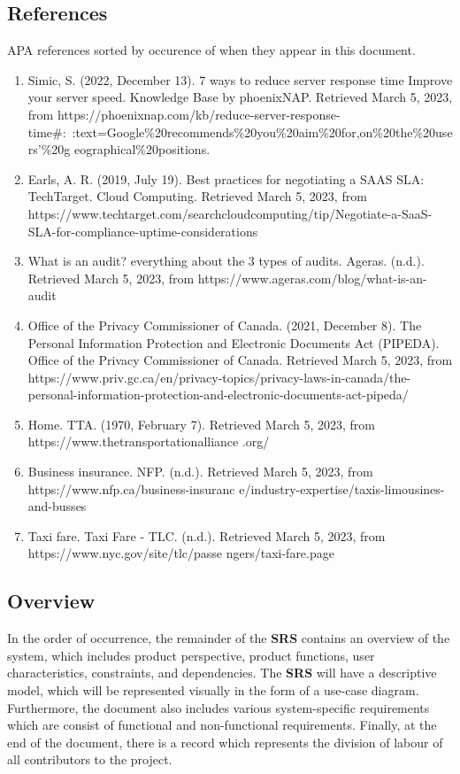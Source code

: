 \documentclass[]{article}
\begin{document}
\subsection{References}
\label{sub:references}
APA references sorted by occurence of when they appear in this document.
\begin{enumerate}
	\item Simic, S. (2022, December 13). 7 ways to reduce server response time {Improve your server speed}. Knowledge Base by phoenixNAP. Retrieved March 5, 2023, from https://phoenixnap.com/kb/reduce-server-response-time\#:~:text=Google\%20recommends\%20you\%20aim\%20for,on\%20the\%20users'\%20g eographical\%20positions.
	\item Earls, A. R. (2019, July 19). Best practices for negotiating a SAAS SLA: TechTarget. Cloud Computing. Retrieved March 5, 2023, from https://www.techtarget.com/searchcloudcomputing/tip/Negotiate-a-SaaS-SLA-for-compliance-uptime-considerations
	\item What is an audit? everything about the 3 types of audits. Ageras. (n.d.). Retrieved March 5, 2023, from https://www.ageras.com/blog/what-is-an-audit
	\item Office of the Privacy Commissioner of Canada. (2021, December 8). The Personal Information Protection and Electronic Documents Act (PIPEDA). Office of the Privacy Commissioner of Canada. Retrieved March 5, 2023, from https://www.priv.gc.ca/en/privacy-topics/privacy-laws-in-canada/the-personal-information-protection-and-electronic-documents-act-pipeda/
	\item Home. TTA. (1970, February 7). Retrieved March 5, 2023, from https://www.thetransportationalliance .org/
	\item Business insurance. NFP. (n.d.). Retrieved March 5, 2023, from https://www.nfp.ca/business-insuranc e/industry-expertise/taxis-limousines-and-busses
	\item Taxi fare. Taxi Fare - TLC. (n.d.). Retrieved March 5, 2023, from https://www.nyc.gov/site/tlc/passe ngers/taxi-fare.page
\end{enumerate}

\subsection{Overview}
\label{sub:overview}
In the order of occurrence, the remainder of the \textbf{SRS} contains an overview of the system, which includes product perspective, product functions, user characteristics, constraints, and dependencies. The \textbf{SRS} will have a descriptive model, which will be represented visually in the form of a use-case diagram. Furthermore, the document also includes various system-specific requirements which are consist of functional and non-functional requirements.  Finally, at the end of the document, there is a record which represents the division of labour of all contributors to the project.
\end{document}
